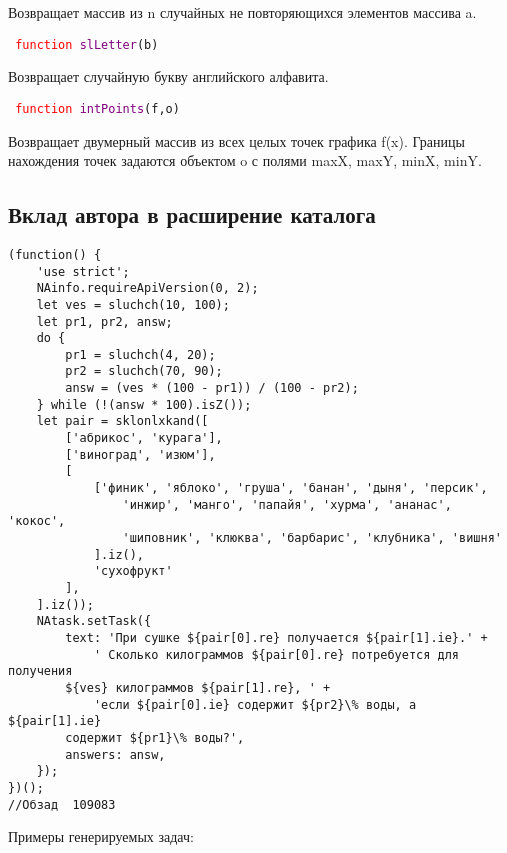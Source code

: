 Возвращает массив из n случайных не повторяющихся элементов массива a.

\texttt{
	\textcolor{Red}{function} \textcolor{Purple}{slLetter}(b)
}

Возвращает случайную букву английского алфавита.%

\hypertarget{intPoints}{\texttt{
		\textcolor{Red}{function} \textcolor{Purple}{intPoints}(f,o)
	}}

Возвращает двумерный массив из всех целых точек графика f(x). Границы нахождения точек задаются объектом o с полями maxX, maxY, minX, minY.
\newpage
\subsection{Вклад автора в расширение каталога}
\begin{lstlisting}
(function() {
	'use strict';
	NAinfo.requireApiVersion(0, 2);
	let ves = sluchch(10, 100);
	let pr1, pr2, answ;
	do {
		pr1 = sluchch(4, 20);
		pr2 = sluchch(70, 90);
		answ = (ves * (100 - pr1)) / (100 - pr2);
	} while (!(answ * 100).isZ());
	let pair = sklonlxkand([
		['абрикос', 'курага'],
		['виноград', 'изюм'],
		[
			['финик', 'яблоко', 'груша', 'банан', 'дыня', 'персик',
				'инжир', 'манго', 'папайя', 'хурма', 'ананас', 'кокос',
				'шиповник', 'клюква', 'барбарис', 'клубника', 'вишня'
			].iz(),
			'сухофрукт'
		],
	].iz());
	NAtask.setTask({
		text: 'При сушке ${pair[0].re} получается ${pair[1].ie}.' +
			' Сколько килограммов ${pair[0].re} потребуется для получения 
		${ves} килограммов ${pair[1].re}, ' +
			'если ${pair[0].ie} содержит ${pr2}\% воды, а ${pair[1].ie} 
		содержит ${pr1}\% воды?',
		answers: answ,
	});
})();
//Обзад  109083
		\end{lstlisting}
Примеры генерируемых задач:

\vspace{\baselineskip}
\vspace{\baselineskip}

\vspace{\baselineskip}

\vspace{\baselineskip}

